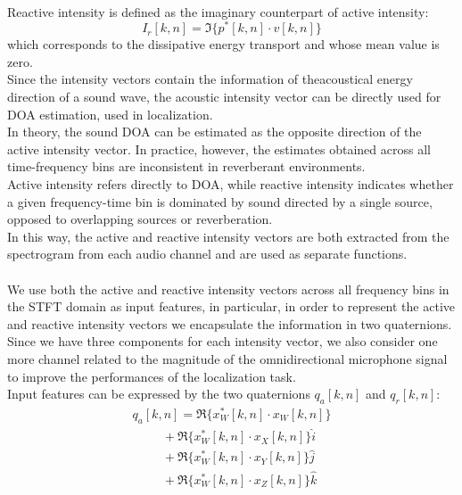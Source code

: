 \documentclass{article}
\begin{document}
    \\ Reactive intensity is defined as the imaginary counterpart of active intensity:
    \begin{equation*}
        I_r [k,n]= \Im \{ p^*[k,n] \cdot v[k,n]\} 
    \end{equation*}
    which corresponds to the dissipative energy transport and whose mean value is zero.
    \\ Since the intensity vectors contain the information of theacoustical energy direction of a sound wave, the acoustic intensity
    vector can be directly used for DOA estimation, used in localization.
    \\ In theory, the sound DOA can be estimated as the opposite direction of the active intensity vector. In practice, however, 
    the estimates obtained across all time-frequency bins are inconsistent in reverberant environments.
    \\ Active intensity refers directly to DOA, while reactive intensity indicates whether a given frequency-time bin is dominated
    by sound directed by a single source, opposed to overlapping sources or reverberation. 
    \\ In this way, the active and reactive intensity vectors are both extracted from the spectrogram from each audio channel and 
    are used as separate functions.
    \\ \\ We use both the active and reactive intensity vectors across all frequency bins in the STFT domain as input features,
    in particular,  in order to represent the active and reactive intensity vectors we encapsulate the information in two quaternions. 
    \\  Since we have three components for each intensity vector, we also consider one more channel related to the magnitude of the
    omnidirectional microphone signal to improve the performances of the localization task.
    \\ Input features can be expressed by the two quaternions $q_a[k,n]$ and $q_r[k,n]$:
    \begin{equation*}
            \begin{matrix}
                q_a[k,n]=\Re\{x_W^*[k,n] \cdot x_W[k,n]\} \\
                \hspace{1cm} + \Re\{x_W^*[k,n] \cdot x_X[k,n]\}\hat{i} \\
                \hspace{1cm} + \Re\{x_W^*[k,n] \cdot x_Y[k,n]\}\hat{j} \\
                \hspace{1cm} + \Re\{x_W^*[k,n]\cdot x_Z[k,n]\}\hat{k} \\
            \end{matrix}
    \end{equation*}
\end{document}
